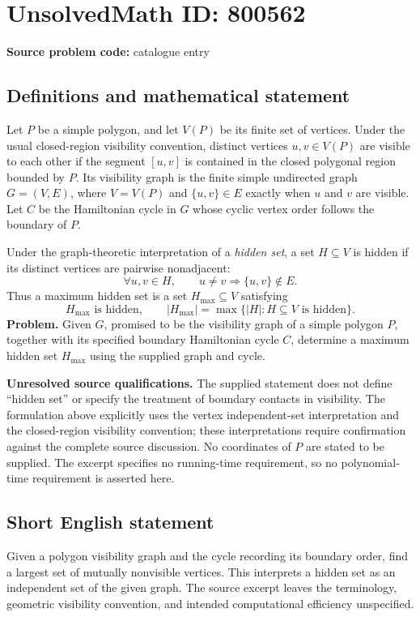 \documentclass[11pt]{article}
\begin{document}
\section*{UnsolvedMath ID: 800562}
\textbf{Source problem code:} catalogue entry
\subsection{Definitions and mathematical statement}
Let \(P\) be a simple polygon, and let \(V(P)\) be its finite set of vertices. Under the usual closed-region visibility convention, distinct vertices \(u,v\in V(P)\) are visible to each other if the segment \([u,v]\) is contained in the closed polygonal region bounded by \(P\). Its visibility graph is the finite simple undirected graph \(G=(V,E)\), where \(V=V(P)\) and \(\{u,v\}\in E\) exactly when \(u\) and \(v\) are visible. Let \(C\) be the Hamiltonian cycle in \(G\) whose cyclic vertex order follows the boundary of \(P\).

Under the graph-theoretic interpretation of a \emph{hidden set}, a set \(H\subseteq V\) is hidden if its distinct vertices are pairwise nonadjacent:
\[
\forall u,v\in H,\qquad u\ne v\Longrightarrow \{u,v\}\notin E.
\]
Thus a maximum hidden set is a set \(H_{\max}\subseteq V\) satisfying
\[
H_{\max}\text{ is hidden},\qquad
|H_{\max}|=\max\bigl\{|H|:H\subseteq V\text{ is hidden}\bigr\}.
\]
\textbf{Problem.} Given \(G\), promised to be the visibility graph of a simple polygon \(P\), together with its specified boundary Hamiltonian cycle \(C\), determine a maximum hidden set \(H_{\max}\) using the supplied graph and cycle.

\textbf{Unresolved source qualifications.} The supplied statement does not define ``hidden set'' or specify the treatment of boundary contacts in visibility. The formulation above explicitly uses the vertex independent-set interpretation and the closed-region visibility convention; these interpretations require confirmation against the complete source discussion. No coordinates of \(P\) are stated to be supplied. The excerpt specifies no running-time requirement, so no polynomial-time requirement is asserted here.
\subsection{Short English statement}
Given a polygon visibility graph and the cycle recording its boundary order, find a largest set of mutually nonvisible vertices. This interprets a hidden set as an independent set of the given graph. The source excerpt leaves the terminology, geometric visibility convention, and intended computational efficiency unspecified.
\end{document}
